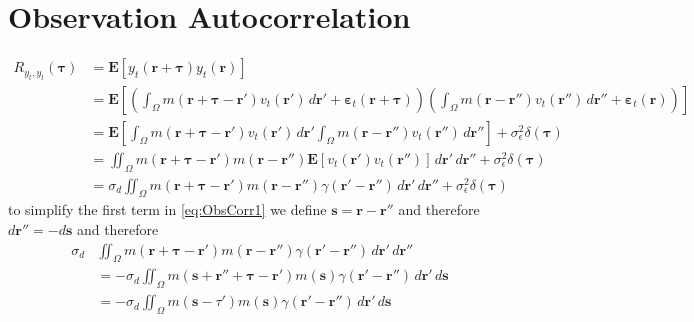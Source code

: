 \documentclass[]{article}
\begin{document}
\section*{Observation Autocorrelation}\label{sec:ObservAutocor} 
\begin{align}
	R_{y_{t},y_{t}}(\boldsymbol{\tau}) &= \mathbf{E}\left[y_{t}\left(\mathbf{r}+\boldsymbol{\tau}\right)y_{t}\left(\mathbf{r}\right)\right] \nonumber\\
	&= \mathbf{E}\left[\left(\int_{\Omega}{ m\left(\mathbf{r} + \boldsymbol{\tau} - \mathbf{r}'\right) v_t\left(\mathbf{r}'\right)\, d\mathbf{r}'} + \boldsymbol{\varepsilon}_t\left(\mathbf{r}+\boldsymbol{\tau}\right)\right) \left(\int_{\Omega}{ m\left(\mathbf{r} - \mathbf{r}''\right) v_{t}\left(\mathbf{r}''\right) \, d\mathbf{r}''} + \boldsymbol{\varepsilon}_{t}\left(\mathbf{r}\right)\right) \right]\nonumber \\
	&=\mathbf{E}\left[\int_{\Omega}{ m\left(\mathbf{r} + \boldsymbol{\tau} - \mathbf{r}'\right) v_t\left(\mathbf{r}'\right)\, d\mathbf{r}'} \int_{\Omega}{ m\left(\mathbf{r} - \mathbf{r}''\right) v_{t}\left(\mathbf{r}''\right) \, d\mathbf{r}''}\right]+\sigma_{\epsilon}^2\delta(\boldsymbol\tau)\nonumber\\
	&=\iint_{\Omega}{ m\left(\mathbf{r} + \boldsymbol{\tau} - \mathbf{r}'\right) m\left(\mathbf{r} - \mathbf{r}''\right) \mathbf{E}\left[v_t\left(\mathbf{r}'\right) v_{t}\left(\mathbf{r}''\right)\right]\, d\mathbf{r}'}{ \, d\mathbf{r}''}+\sigma_{\epsilon}^2\delta(\boldsymbol\tau) \nonumber\\
	&=\sigma_d\iint_{\Omega}{ m\left(\mathbf{r} + \boldsymbol{\tau} - \mathbf{r}'\right) m\left(\mathbf{r} - \mathbf{r}''\right)\gamma(\mathbf{r}'-\mathbf{r}'') \, d\mathbf{r}'}{ \, d\mathbf{r}''}+\sigma_{\epsilon}^2\delta(\boldsymbol\tau)\label{eq:ObsCorr1}
\end{align}
to simplify the first term in \eqref{eq:ObsCorr1} we define $\mathbf s=\mathbf r-\mathbf r''$ and therefore $d\mathbf r''=-d\mathbf s$ and therefore
\begin{align}
\sigma_d&\iint_{\Omega}{m\left(\mathbf{r}  + \boldsymbol{\tau}- \mathbf{r}'\right)m\left(\mathbf{r} - \mathbf{r}''\right)\gamma(\mathbf{r}'-\mathbf{r}'') \, d\mathbf{r}'}{ \, d\mathbf{r}''}\nonumber\\
&=-\sigma_d\iint_{\Omega}{ m\left(\mathbf{s} + \mathbf{r}''+\boldsymbol{\tau} - \mathbf{r}'\right) m\left(\mathbf{s}\right)\gamma(\mathbf{r}'-\mathbf{r}'') \, d\mathbf{r}'}{ \, d\mathbf{s}}\nonumber\\
&=-\sigma_d\iint_{\Omega}{ m\left(\mathbf{s}-\tau'\right) m\left(\mathbf{s}\right)\gamma(\mathbf{r}'-\mathbf{r}'') \, d\mathbf{r}'}{ \, d\mathbf{s}}
\end{align}
\end{document}
